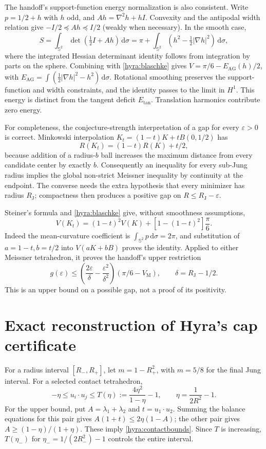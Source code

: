 \documentclass[11pt]{article}
\theoremstyle{remark}\newtheorem{remark}[theorem]{Remark}
\newcommand{\Sph}{\mathbb S^2}
\newcommand{\VM}{V_{\mathrm M}}
\newcommand{\RJ}{R_{\mathrm J}}
\newcommand{\dd}{\,\mathrm d}
\newcommand{\Et}{E_{\mathrm{tan}}}
\begin{document}
The handoff's support-function energy normalization is also consistent. Write $p=1/2+h$ with $h$ odd, and $Ah=\nabla^2h+hI$. Convexity and the antipodal width relation give $-I/2\preceq Ah\preceq I/2$ (weakly when necessary). In the smooth case,
\[
 S=\int_{\Sph}\det(\tfrac12I+Ah)\dd\sigma
 =\pi+\int_{\Sph}(h^2-\tfrac12|\nabla h|^2)\dd\sigma,
\]
where the integrated Hessian determinant identity follows from integration by parts on the sphere. Combining with \eqref{hyra:blaschke} gives $V=\pi/6-E_{\mathrm{AG}}(h)/2$, with $E_{\mathrm{AG}}=\int(\tfrac12|\nabla h|^2-h^2)\dd\sigma$. Rotational smoothing preserves the support-function and width constraints, and the identity passes to the limit in $H^1$. This energy is distinct from the tangent deficit $\Et$. Translation harmonics contribute zero energy.

For completeness, the conjecture-strength interpretation of a gap for every $\varepsilon>0$ is correct. Minkowski interpolation $K_t=(1-t)K+tB(0,1/2)$ has
\[
 R(K_t)=(1-t)R(K)+t/2,
\]
because addition of a radius-$b$ ball increases the maximum distance from every candidate center by exactly $b$. Consequently an inequality for every sub-Jung radius implies the global non-strict Meissner inequality by continuity at the endpoint. The converse needs the extra hypothesis that every minimizer has radius $\RJ$; compactness then produces a positive gap on $R\leq\RJ-\varepsilon$.

Steiner's formula and \eqref{hyra:blaschke} give, without smoothness assumptions,
\begin{equation}\label{hyra:interpolation}
 V(K_t)=(1-t)^2V(K)+[1-(1-t)^2]\frac\pi6.
\end{equation}
Indeed the mean-curvature coefficient is $\int_{\Sph}p\dd\sigma=2\pi$, and substitution of $a=1-t,b=t/2$ into $V(aK+bB)$ proves the identity. Applied to either Meissner tetrahedron, it proves the handoff's upper restriction
\[
 g(\varepsilon)\leq\left(\frac{2\varepsilon}{\delta}-\frac{\varepsilon^2}{\delta^2}\right)(\pi/6-\VM),
 \qquad\delta=\RJ-1/2.
\]
This is an upper bound on a possible gap, not a proof of its positivity.

\section{Exact reconstruction of Hyra's cap certificate}
For a radius interval $[R_-,R_+]$, let $m=1-R_+^2$, with $m=5/8$ for the final Jung interval. For a selected contact tetrahedron,
\begin{equation}\label{hyra:contactbounds}
 -\eta\leq u_i\cdot u_j\leq T(\eta):=\frac{4\eta^2}{1-\eta}-1,
 \qquad \eta=\frac1{2R^2}-1.
\end{equation}
For the upper bound, put $A=\lambda_1+\lambda_2$ and $t=u_1\cdot u_2$. Summing the balance equations for this pair gives $A(1+t)\leq2\eta(1-A)$; the other pair gives $A\geq(1-\eta)/(1+\eta)$. These imply \eqref{hyra:contactbounds}. Since $T$ is increasing, $T(\eta_-)$ for $\eta_-=1/(2R_-^2)-1$ controls the entire interval.
\end{document}
